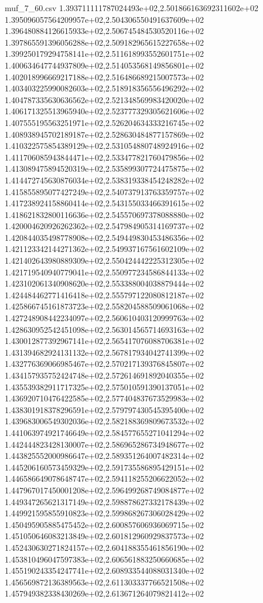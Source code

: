 \begin{filecontents*}{muf_7_60.csv}
1.393711111787024493e+02,2.501866163692311602e+02
1.395096057564209957e+02,2.504306550491637609e+02
1.396480884126615933e+02,2.506745484530520116e+02
1.397865591396056288e+02,2.509182965615227658e+02
1.399250179294758141e+02,2.511618993552601751e+02
1.400634647744937809e+02,2.514053568149856801e+02
1.402018996669217188e+02,2.516486689215007573e+02
1.403403225990082603e+02,2.518918356556496292e+02
1.404787335630636562e+02,2.521348569983420020e+02
1.406171325513965940e+02,2.523777329305621606e+02
1.407555195563251971e+02,2.526204634333216745e+02
1.408938945702189187e+02,2.528630484877157869e+02
1.410322575854389129e+02,2.531054880748924916e+02
1.411706085943844471e+02,2.533477821760479856e+02
1.413089475894520319e+02,2.535899307724475875e+02
1.414472745630876034e+02,2.538319338454248282e+02
1.415855895077427249e+02,2.540737913763359757e+02
1.417238924158860414e+02,2.543155033466391615e+02
1.418621832800116636e+02,2.545570697378088880e+02
1.420004620926262362e+02,2.547984905314169737e+02
1.420844035498778908e+02,2.549449830453486356e+02
1.421123342144271362e+02,2.549937167561602109e+02
1.421402643980889309e+02,2.550424442225312305e+02
1.421719540940779041e+02,2.550977234586844133e+02
1.423102061340908620e+02,2.553388004038879444e+02
1.424484462771416418e+02,2.555797122080812187e+02
1.425866745161873723e+02,2.558204588509061068e+02
1.427248908442234097e+02,2.560610403120999763e+02
1.428630952542451098e+02,2.563014565714693163e+02
1.430012877392967141e+02,2.565417076088706381e+02
1.431394682924131132e+02,2.567817934042741399e+02
1.432776369066985467e+02,2.570217139376845807e+02
1.434157935752424748e+02,2.572614691892040355e+02
1.435539382911717325e+02,2.575010591390137051e+02
1.436920710476422585e+02,2.577404837673529983e+02
1.438301918378296591e+02,2.579797430545395400e+02
1.439683006549302036e+02,2.582188369809673532e+02
1.441063974921746649e+02,2.584577655271041294e+02
1.442444823428130007e+02,2.586965286734948677e+02
1.443825552000986647e+02,2.589351264007482314e+02
1.445206160573459329e+02,2.591735586895429151e+02
1.446586649078648747e+02,2.594118255206622052e+02
1.447967017450001208e+02,2.596499268749084877e+02
1.449347265621317149e+02,2.598878627332178439e+02
1.449921595855910823e+02,2.599868267306028429e+02
1.450495905885475452e+02,2.600857606936069715e+02
1.451050646083213849e+02,2.601812960929837573e+02
1.452430630271824157e+02,2.604188355461856190e+02
1.453810496047597383e+02,2.606561883250660685e+02
1.455190243354247741e+02,2.608933544088031340e+02
1.456569872136389563e+02,2.611303337766521508e+02
1.457949382338430269e+02,2.613671264079821412e+02

\end{filecontents*}
